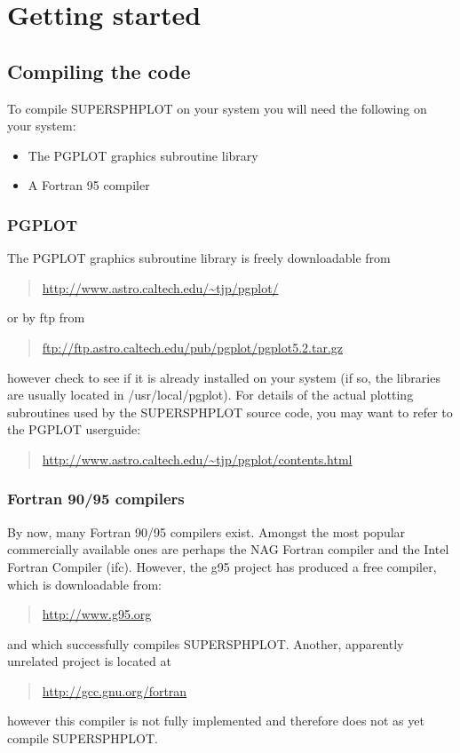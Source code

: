 \documentclass[a4paper,12pt]{article}
\begin{document}
\section{Getting started}
\subsection{Compiling the code}
 To compile SUPERSPHPLOT on your system you will need the following on your
system:
\begin{itemize}
\item The PGPLOT graphics subroutine library
\item A Fortran 95 compiler
\end{itemize}

\subsubsection{PGPLOT}
 The PGPLOT
graphics subroutine library is freely downloadable from
\begin{quote}
\url{http://www.astro.caltech.edu/~tjp/pgplot/}
\end{quote}
or by ftp from
\begin{quote}
\url{ftp://ftp.astro.caltech.edu/pub/pgplot/pgplot5.2.tar.gz}
\end{quote}
however check to see if it is already installed on your system (if so, the libraries are
usually located in /usr/local/pgplot). For details of the actual plotting subroutines
used by the SUPERSPHPLOT source code, you may want to refer to the PGPLOT userguide:
\begin{quote}
\url{http://www.astro.caltech.edu/~tjp/pgplot/contents.html}
\end{quote}


\subsubsection{Fortran 90/95 compilers}
 By now, many Fortran 90/95 compilers exist. Amongst the most popular commercially
available ones are perhaps the NAG Fortran compiler and the Intel Fortran Compiler (ifc). However, the
g95 project has produced a free compiler, which is downloadable from:
\begin{quote}
\url{http://www.g95.org}
\end{quote}
and which successfully compiles SUPERSPHPLOT. Another, apparently unrelated project is located at
\begin{quote}
\url{http://gcc.gnu.org/fortran}
\end{quote}
however this compiler is not fully implemented and therefore does not as yet compile SUPERSPHPLOT.
\end{document}
